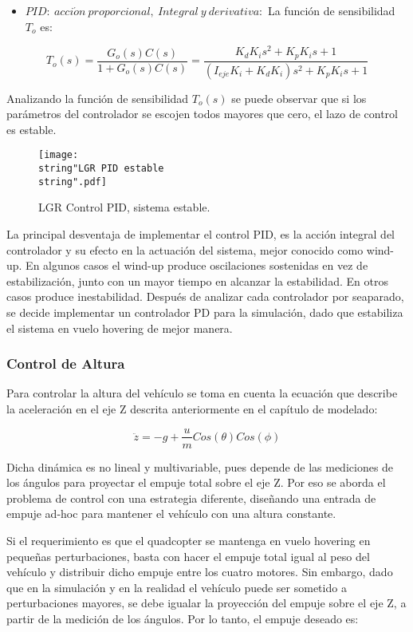 \documentclass[\main/main.tex]{subfiles}
\begin{document}
\begin{itemize}
\item $PID:\ acci\acute{o}n\ proporcional,\ Integral\ y\ derivativa:$ La
función de sensibilidad $T_{o}$ es:
\end{itemize}
\[
T_{o}(s)=\frac{G_{o}(s)C(s)}{1+G_{o}(s)C(s)}=\frac{K_{d}K_{i}s^{2}+K_{p}K_{i}s+1}{(I_{eje}K_{i}+K_{d}K_{i})s^{2}+K_{p}K_{i}s+1}
\]


Analizando la función de sensibilidad $T_{o}(s)$ se puede observar
que si los parámetros del controlador se escojen todos mayores que
cero, el lazo de control es estable. 

\begin{figure}[H]
\noindent \begin{centering}
\texttt{[image: \\string"LGR PID estable\\string".pdf]}
\par\end{centering}
\caption{LGR Control PID, sistema estable.}
\end{figure}

La principal desventaja de implementar el control PID, es la acción integral del controlador y su efecto en la actuación del sistema, mejor conocido como wind-up. 
En algunos casos el wind-up produce oscilaciones sostenidas en vez de estabilización, junto con un mayor tiempo en alcanzar la estabilidad. En otros casos produce inestabilidad. 
Después de analizar cada controlador por seaparado, se decide implementar
un controlador PD para la simulación, dado que estabiliza el sistema
en vuelo hovering de mejor manera. 

\subsubsection{Control de Altura}

Para controlar la altura del vehículo se toma en cuenta la ecuación
que describe la aceleración en el eje Z descrita anteriormente en
el capítulo de modelado:

\[
\ddot{z}=-g+\frac{u}{m}Cos(\theta)Cos(\phi)
\]

Dicha dinámica es no lineal y multivariable, pues depende de las mediciones
de los ángulos para proyectar el empuje total sobre el eje Z. Por
eso se aborda el problema de control con una estrategia diferente,
diseñando una entrada de empuje ad-hoc para mantener el vehículo con
una altura constante.

Si el requerimiento es que el quadcopter se mantenga en vuelo hovering
en pequeñas perturbaciones, basta con hacer el empuje total igual
al peso del vehículo y distribuir dicho empuje entre los cuatro motores.
Sin embargo, dado que en la simulación y en la realidad el vehículo
puede ser sometido a perturbaciones mayores, se debe igualar la proyección
del empuje sobre el eje Z, a partir de la medición de los ángulos.
Por lo tanto, el empuje deseado es:
\end{document}
